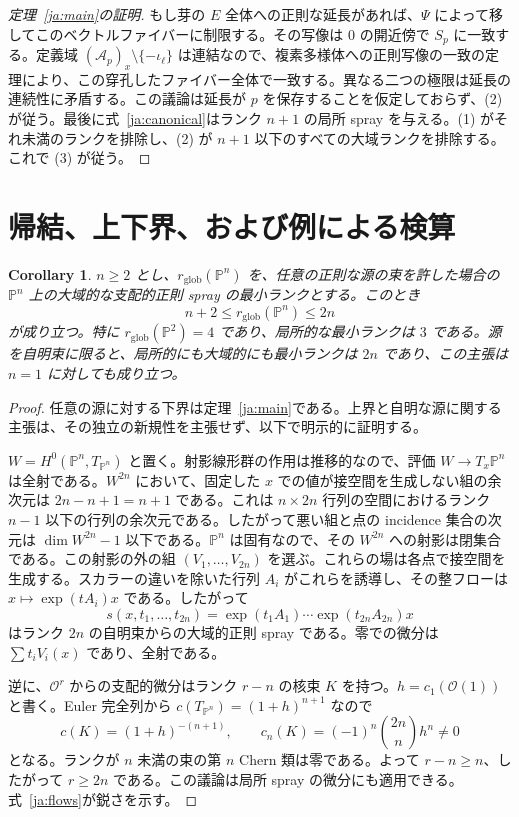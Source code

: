 \documentclass[12pt]{amsart}
\newtheorem{cor}[thm]{Corollary}
\theoremstyle{definition}
\theoremstyle{remark}
\numberwithin{equation}{section}
\newcommand{\cA}{\mathcal{A}}
\newcommand{\cO}{\mathcal{O}}
\newcommand{\mP}{\mathbb{P}}
\begin{document}
\begin{proof}[定理~\ref{ja:main}の証明]
もし芽の $E$ 全体への正則な延長があれば、$\Psi$ によって移してこのベクトルファイバーに制限する。その写像は $0$ の開近傍で $S_p$ に一致する。定義域 $(\cA_p)_x\setminus\{-\iota_\ell\}$ は連結なので、複素多様体への正則写像の一致の定理により、この穿孔したファイバー全体で一致する。異なる二つの極限は延長の連続性に矛盾する。この議論は延長が $p$ を保存することを仮定しておらず、(2) が従う。最後に式~\eqref{ja:canonical}はランク $n+1$ の局所 spray を与える。(1) がそれ未満のランクを排除し、(2) が $n+1$ 以下のすべての大域ランクを排除する。これで (3) が従う。
\end{proof}

\section{帰結、上下界、および例による検算}
\begin{cor}\label{ja:globalbounds}
$n\geq2$ とし、$r_{\mathrm{glob}}(\mP^n)$ を、任意の正則な源の束を許した場合の $\mP^n$ 上の大域的な支配的正則 spray の最小ランクとする。このとき
\[
n+2\leq r_{\mathrm{glob}}(\mP^n)\leq2n
\]
が成り立つ。特に $r_{\mathrm{glob}}(\mP^2)=4$ であり、局所的な最小ランクは $3$ である。源を自明束に限ると、局所的にも大域的にも最小ランクは $2n$ であり、この主張は $n=1$ に対しても成り立つ。
\end{cor}
\begin{proof}
任意の源に対する下界は定理~\ref{ja:main}である。上界と自明な源に関する主張は、その独立の新規性を主張せず、以下で明示的に証明する。

$W=H^0(\mP^n,T_{\mP^n})$ と置く。射影線形群の作用は推移的なので、評価 $W\to T_x\mP^n$ は全射である。$W^{2n}$ において、固定した $x$ での値が接空間を生成しない組の余次元は $2n-n+1=n+1$ である。これは $n\times2n$ 行列の空間におけるランク $n-1$ 以下の行列の余次元である。したがって悪い組と点の incidence 集合の次元は $\dim W^{2n}-1$ 以下である。$\mP^n$ は固有なので、その $W^{2n}$ への射影は閉集合である。この射影の外の組 $(V_1,\ldots,V_{2n})$ を選ぶ。これらの場は各点で接空間を生成する。スカラーの違いを除いた行列 $A_i$ がこれらを誘導し、その整フローは $x\mapsto\exp(tA_i)x$ である。したがって
\begin{equation}\label{ja:flows}
s(x,t_1,\ldots,t_{2n})
=\exp(t_1A_1)\cdots\exp(t_{2n}A_{2n})x
\end{equation}
はランク $2n$ の自明束からの大域的正則 spray である。零での微分は $\sum t_iV_i(x)$ であり、全射である。

逆に、$\cO^r$ からの支配的微分はランク $r-n$ の核束 $K$ を持つ。$h=c_1(\cO(1))$ と書く。Euler 完全列から $c(T_{\mP^n})=(1+h)^{n+1}$ なので
\[
c(K)=(1+h)^{-(n+1)},\qquad
c_n(K)=(-1)^n\binom{2n}{n}h^n\ne0
\]
となる。ランクが $n$ 未満の束の第 $n$ Chern 類は零である。よって $r-n\geq n$、したがって $r\geq2n$ である。この議論は局所 spray の微分にも適用できる。式~\eqref{ja:flows}が鋭さを示す。
\end{proof}
\end{document}
